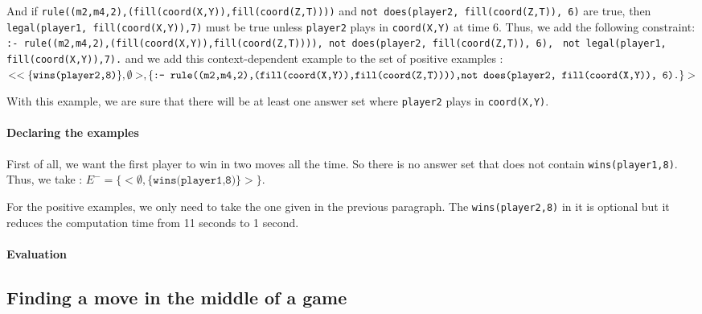 \documentclass[12pt,twoside]{report}
\begin{document}
\bigskip

And if \texttt{rule((m2,m4,2),(fill(coord(X,Y)),fill(coord(Z,T))))} and \texttt{not does(player2, fill(coord(Z,T)), 6)} are true, then \texttt{legal(player1, fill(coord(X,Y)),7)} must be true unless \texttt{player2} plays in \texttt{coord(X,Y)} at time 6. Thus, we add the following constraint:\newline
\texttt{:- rule((m2,m4,2),(fill(coord(X,Y)),fill(coord(Z,T)))), not does(player2, fill(coord(Z,T)), 6),}
\texttt{ not legal(player1, fill(coord(X,Y)),7).}\newline
and we add this context-dependent example to the set of positive examples : \newline
$<<\{\texttt{wins(player2,8)}\},\emptyset>,\\ \{\texttt{:- rule((m2,m4,2),(fill(coord(X,Y)),fill(coord(Z,T)))),} \\ \texttt{not does(player2, fill(coord(X,Y)), 6).}\}>$

\smallskip

With this example, we are sure that there will be at least one answer set where \texttt{player2} plays in \texttt{coord(X,Y)}.


\paragraph{Declaring the examples}

First of all, we want the first player to win in two moves all the time. So there is no answer set that does not contain \texttt{wins(player1,8)}. Thus, we take : $E^-=\{<\emptyset,\{\texttt{wins(player1,8)}\}>\}$.

\bigskip

For the positive examples, we only need to take the one given in the previous paragraph. The \texttt{wins(player2,8)} in it is optional but it reduces the computation time from 11 seconds to 1 second.

\paragraph{Evaluation}


\subsection{Finding a move in the middle of a game}
\end{document}
